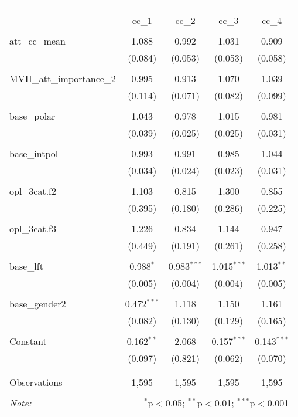 
\begin{table}[!htbp] \centering 
  \caption{} 
  \label{} 
\begin{tabular}{@{\extracolsep{5pt}}lcccc} 
\\[-1.8ex]\hline 
\hline \\[-1.8ex] 
\\[-1.8ex] & cc\_1 & cc\_2 & cc\_3 & cc\_4 \\ 
\hline \\[-1.8ex] 
 att\_cc\_mean & 1.088 & 0.992 & 1.031 & 0.909 \\ 
  & (0.084) & (0.053) & (0.053) & (0.058) \\ 
  & & & & \\ 
 MVH\_att\_importance\_2 & 0.995 & 0.913 & 1.070 & 1.039 \\ 
  & (0.114) & (0.071) & (0.082) & (0.099) \\ 
  & & & & \\ 
 base\_polar & 1.043 & 0.978 & 1.015 & 0.981 \\ 
  & (0.039) & (0.025) & (0.025) & (0.031) \\ 
  & & & & \\ 
 base\_intpol & 0.993 & 0.991 & 0.985 & 1.044 \\ 
  & (0.034) & (0.024) & (0.023) & (0.031) \\ 
  & & & & \\ 
 opl\_3cat.f2 & 1.103 & 0.815 & 1.300 & 0.855 \\ 
  & (0.395) & (0.180) & (0.286) & (0.225) \\ 
  & & & & \\ 
 opl\_3cat.f3 & 1.226 & 0.834 & 1.144 & 0.947 \\ 
  & (0.449) & (0.191) & (0.261) & (0.258) \\ 
  & & & & \\ 
 base\_lft & 0.988$^{*}$ & 0.983$^{***}$ & 1.015$^{***}$ & 1.013$^{**}$ \\ 
  & (0.005) & (0.004) & (0.004) & (0.005) \\ 
  & & & & \\ 
 base\_gender2 & 0.472$^{***}$ & 1.118 & 1.150 & 1.161 \\ 
  & (0.082) & (0.130) & (0.129) & (0.165) \\ 
  & & & & \\ 
 Constant & 0.162$^{**}$ & 2.068 & 0.157$^{***}$ & 0.143$^{***}$ \\ 
  & (0.097) & (0.821) & (0.062) & (0.070) \\ 
  & & & & \\ 
\hline \\[-1.8ex] 
Observations & 1,595 & 1,595 & 1,595 & 1,595 \\ 
\hline 
\hline \\[-1.8ex] 
\textit{Note:}  & \multicolumn{4}{r}{$^{*}$p$<$0.05; $^{**}$p$<$0.01; $^{***}$p$<$0.001} \\ 
\end{tabular} 
\end{table} 
